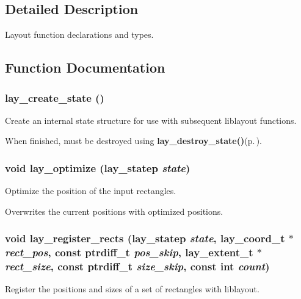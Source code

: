 \subsection{Detailed Description}
Layout function declarations and types. 



\subsection{Function Documentation}
\subsubsection{ lay\_\-create\_\-state ()}\label{layout_8h_a1}


Create an internal state structure for use with subsequent liblayout functions. 

When finished, must be destroyed using {\bf lay\_\-destroy\_\-state()}{\rm (p.\,\pageref{layout_8h_a2})}. 
\subsubsection{\setlength{\rightskip}{0pt plus 5cm}void lay\_\-optimize ({\bf lay\_\-statep} {\em state})}\label{layout_8h_a13}


Optimize the position of the input rectangles. 

Overwrites the current positions with optimized positions. 
\subsubsection{\setlength{\rightskip}{0pt plus 5cm}void lay\_\-register\_\-rects ({\bf lay\_\-statep} {\em state}, {\bf lay\_\-coord\_\-t} $\ast$ {\em rect\_\-pos}, const ptrdiff\_\-t {\em pos\_\-skip}, {\bf lay\_\-extent\_\-t} $\ast$ {\em rect\_\-size}, const ptrdiff\_\-t {\em size\_\-skip}, const int {\em count})}\label{layout_8h_a4}


Register the positions and sizes of a set of rectangles with liblayout. 

